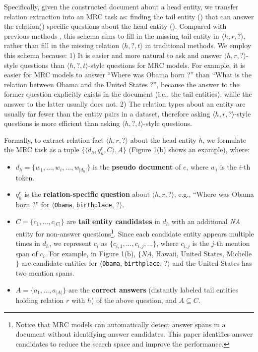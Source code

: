 \documentclass[11pt,a4paper]{article}
\begin{document}
  Specifically, given the constructed document about a head entity, we transfer relation extraction into an MRC task as: finding the tail entity () that can answer the relation()-specific questions about the head entity ().
  Compared with previous methods \cite{lin_neural_2016, ye_distant_2019}, this schema aims to fill in the missing tail entity in $\langle h, r, ?\rangle$, rather than fill in the missing relation $\langle h, ?, t\rangle$ in traditional methods.
  We employ this schema because:
  1) It is easier and more natural to ask and answer $\langle h, r, ?\rangle$-style questions than $\langle h, ?, t\rangle$-style questions for MRC models.
  For example, it is easier for MRC models to answer ``Where was Obama born ?'' than ``What is the relation between Obama and the United States ?'', because the answer to the former question explicitly exists in the document (i.e., the tail entities), while the answer to the latter usually does not.
  2) The relation types about an entity are usually far fewer than the entity pairs in a dataset, therefore asking $\langle h, r, ?\rangle$-style questions is more efficient than asking $\langle h, ?, t\rangle$-style questions.
  
  Formally, to extract relation fact $\langle h, r, ?\rangle$ about the head entity $h$, we formulate the MRC task as a tuple $\{ \langle d_h, q_h^r, C\rangle, A\}$ (Figure 1(b) shows an example), where:
  \begin{itemize}
    \setlength{\itemsep}{0pt}
    \setlength{\parsep}{0pt}
    \setlength{\parskip}{0pt}
    \item $d_h=\{w_1, ...,w_i,..., w_{|d_h|}\}$ is the \textbf{pseudo document} of $e$, where $w_i$ is the $i$-th token.
    \item $q_h^r$ is the \textbf{relation-specific question} about $\langle{h, r, ?}\rangle$, e.g., ``Where was Obama born ?'' for $\langle$\texttt{Obama}, \texttt{birthplace}, ?$\rangle$.
    \item $C=\{c_1, ..., c_{|C|}\}$ are \textbf{tail entity candidates} in $d_h$ with an additional \emph{NA} entity for non-answer questions\footnote{Notice that MRC models can automatically detect answer spans in a document without identifying answer candidates. This paper identifies answer candidates to reduce the search space and improve the performance.}.
    Since each candidate entity appears multiple times in $d_h$, we represent $c_i$ as $\{c_{i,1},...,c_{i,j},...\}$, where $c_{i,j}$ is the $j$-th mention span of $c_i$. For example, in Figure 1(b), $\{$\emph{NA}, Hawaii, United States, Michelle$\}$ are candidate entities for $\langle$\texttt{Obama}, \texttt{birthplace}, ?$\rangle$ and the United States has two mention spans.
    \item $A=\{a_1, ..., a_{|A|}\}$ are the \textbf{correct answers} (distantly labeled tail entities holding relation $r$ with $h$) of the above question, and $A \subseteq C$.
  \end{itemize}
  
\end{document}

